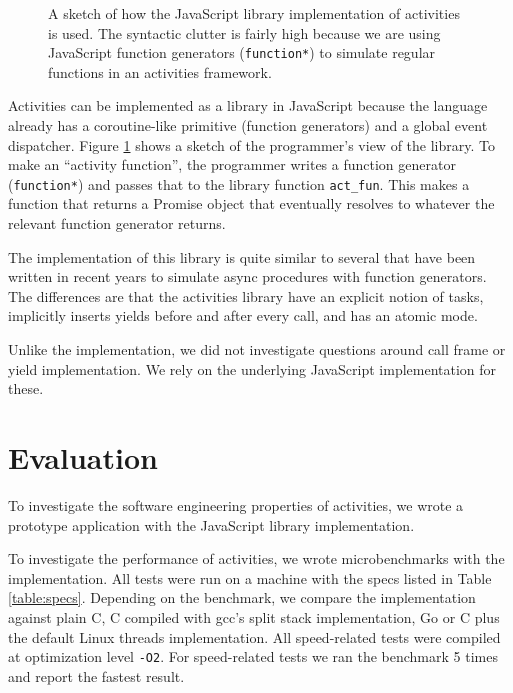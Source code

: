 \documentclass[a4paper,UKenglish,cleveref, autoref]{lipics-v2019}
\begin{document}
\begin{figure}
\caption{A sketch of how the JavaScript library implementation of activities is used.
The syntactic clutter is fairly high because we are using JavaScript function generators (\texttt{function*}) to simulate regular functions in an activities framework.}
\label{fig:trivial_js}
\end{figure}

Activities can be implemented as a library in JavaScript because the language already has a coroutine-like primitive (function generators) and a global event dispatcher.
Figure \ref{fig:trivial_js} shows a sketch of the programmer's view of the library.
To make an ``activity function'', the programmer writes a function generator (\texttt{function*}) and passes that to the library function \texttt{act\_fun}.
This makes a function that returns a Promise object that eventually resolves to whatever the relevant function generator returns.

The implementation of this library is quite similar to several that have been written in recent years to simulate async procedures with function generators.
The differences are that the activities library have an explicit notion of tasks, implicitly inserts yields before and after every call, and has an atomic mode.

Unlike the \charcoal{} implementation, we did not investigate questions around call frame or yield implementation.
We rely on the underlying JavaScript implementation for these.

\section{Evaluation}

To investigate the software engineering properties of activities, we wrote a prototype application with the JavaScript library implementation.

To investigate the performance of activities, we wrote microbenchmarks with the \charcoal{} implementation.
All tests were run on a machine with the specs listed in Table \ref{table:specs}.
Depending on the benchmark, we compare the \charcoal{} implementation against plain C, C compiled with gcc's split stack implementation, Go or C plus the default Linux threads implementation.
All speed-related tests were compiled at optimization level \texttt{-O2}.
For speed-related tests we ran the benchmark 5 times and report the fastest result.
\end{document}
